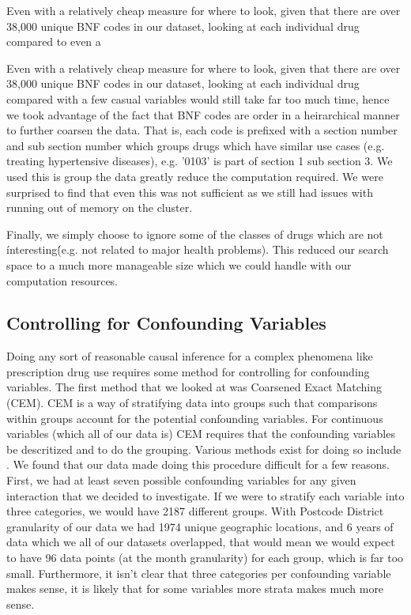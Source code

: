 \documentclass[a4paper]{article}
\begin{document}
		Even with a relatively cheap measure for where to look, given that there are over 38,000 unique BNF codes in 
		our dataset, looking at each individual drug compared to even a

		Even with a relatively cheap measure for where to look, given that there are over 38,000 unique BNF codes in 
		our dataset, looking at each individual drug compared with a few casual variables would still take 
		far too much time, hence we took advantage of the fact that BNF codes are order in a heirarchical manner to 
		further coarsen the data. That is, each code is prefixed with a section number and sub section number which groups 
		drugs which have similar use cases (e.g. treating hypertensive diseases), e.g.
		'0103' is part of section 1 sub section 3. We used this is group the data greatly reduce the computation 
		required. We were surprised to find that even this was not sufficient as we still had issues with running out
		of memory on the cluster. 

		Finally, we simply choose to ignore some of the classes of drugs which are 
		not \'interesting\' (e.g. not related to major health problems). This reduced our 
		search space to a much more manageable size which we could handle with our computation resources.





	\subsection{Controlling for Confounding Variables}

		Doing any sort of reasonable causal inference for a complex phenomena like prescription 
		drug use requires some method for controlling for confounding variables. The first
		method that we looked at was Coarsened Exact Matching (CEM). CEM is a way of stratifying 
		data into groups such that comparisons within groups account for the potential confounding 
		variables. For continuous variables (which all of our data is) CEM requires that the 
		confounding variables be descritized and to do the grouping. Various methods
		exist for doing so include 
		. We found that our data made doing this procedure difficult for a few reasons. First,
		we had at least seven possible confounding variables for any given interaction that we decided 
		to investigate. If we were to stratify each variable into three categories, we would have 2187
		different groups. With Postcode District granularity of our data we had 1974 unique geographic 
		locations, and 6 years of data which we all of our datasets overlapped, that would mean we would
		expect to have 96 data points (at the month granularity) for each group, which is far too small. 
		Furthermore, it isn't clear that three categories per confounding variable makes sense, it is 
		likely that for some variables more strata makes much more sense. 
		
\end{document}
